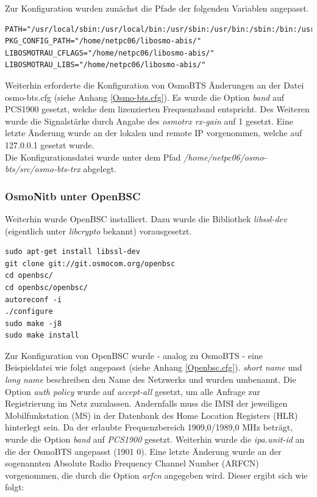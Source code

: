 Zur Konfiguration wurden zunächst die Pfade der folgenden Variablen angepasst.

\begin{lstlisting}
PATH="/usr/local/sbin:/usr/local/bin:/usr/sbin:/usr/bin:/sbin:/bin:/usr/games:/usr/local/games"
PKG_CONFIG_PATH="/home/netpc06/libosmo-abis/"
LIBOSMOTRAU_CFLAGS="/home/netpc06/libosmo-abis/"
LIBOSMOTRAU_LIBS="/home/netpc06/libosmo-abis/"
\end{lstlisting}

Weiterhin erforderte die Konfiguration von OsmoBTS Änderungen an der Datei osmo-bts.cfg (siehe Anhang \ref{Osmo-bts.cfg}). Es wurde die Option \textit{band} auf PCS1900 gesetzt, welche dem lizenzierten Frequenzband entspricht. Des Weiteren wurde    die Signalstärke durch Angabe des \textit{osmotrx rx-gain} auf 1 gesetzt. Eine letzte Änderung wurde an der lokalen und remote IP vorgenommen, welche auf 127.0.0.1 gesetzt wurde. \\

Die Konfigurationsdatei wurde unter dem Pfad \textit{/home/netpc06/osmo-bts/src/osmo-bts-trx} abgelegt. 

\subsubsection{OsmoNitb unter OpenBSC}
Weiterhin wurde OpenBSC installiert. Dazu wurde die Bibliothek \textit{libssl-dev} (eigentlich unter \textit{libcrypto} bekannt) vorausgesetzt.

\begin{lstlisting}
sudo apt-get install libssl-dev
git clone git://git.osmocom.org/openbsc
cd openbsc/
cd openbsc/openbsc/
autoreconf -i
./configure 
sudo make -j8
sudo make install
\end{lstlisting}

Zur Konfiguration von OpenBSC wurde - analog zu OsmoBTS - eine Beispieldatei wie folgt angepasst (siehe Anhang \ref{Openbsc.cfg}). \textit{short name} und \textit{long name} beschreiben den Name des Netzwerks und wurden umbenannt. Die Option \textit{auth policy} wurde auf \textit{accept-all} gesetzt, um alle Anfrage zur Registrierung im Netz zuzulassen. Andernfalls muss die IMSI der jeweiligen Mobilfunkstation (MS) in der Datenbank des Home Location Registers (HLR) hinterlegt sein. Da der erlaubte Frequenzbereich 1909,0/1989,0 MHz beträgt, wurde die Option \textit{band} auf \textit{PCS1900} gesetzt. Weiterhin wurde die \textit{ipa.unit-id} an die der OsmoBTS angepasst (1901 0). Eine letzte Änderung wurde an der sogenannten Absolute Radio Frequency Channel Number (ARFCN) vorgenommen, die durch die Option \textit{arfcn} angegeben wird. Dieser ergibt sich wie folgt:

